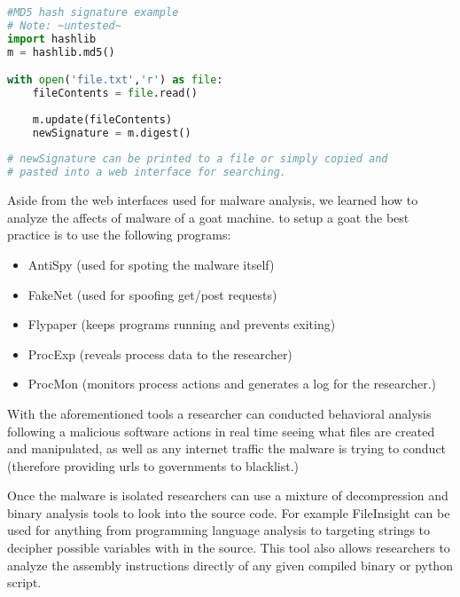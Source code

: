 \documentclass[letterpaper,12pt,titlepage,onecolumn]{IEEEtran}
\begin{document}
\begin{lstlisting}[language=Python]
#MD5 hash signature example
# Note: ~untested~
import hashlib
m = hashlib.md5()

with open('file.txt','r') as file:
    fileContents = file.read()
    
    m.update(fileContents)
    newSignature = m.digest()
    
# newSignature can be printed to a file or simply copied and 
# pasted into a web interface for searching.
\end{lstlisting}

Aside from the web interfaces used for malware analysis, we learned how to analyze the affects of malware of a goat machine. to setup a goat the best practice is to use the following programs:
\begin{itemize}
    \item AntiSpy (used for spoting the malware itself)
    \item FakeNet (used for spoofing get/post requests)
    \item Flypaper (keeps programs running and prevents exiting)
    \item ProcExp (reveals process data to the researcher)
    \item ProcMon (monitors process actions and generates a log for the researcher.)
\end{itemize}

With the aforementioned tools a researcher can conducted behavioral analysis following a malicious software actions in real time seeing what files are created and manipulated, as well as any internet traffic the malware is trying to conduct (therefore providing urls to governments to blacklist.)\par

Once the malware is isolated researchers can use a mixture of decompression and binary analysis tools to look into the source code. For example FileInsight can be used for anything from programming language analysis to targeting strings to decipher possible variables with in the source. This tool also allows researchers to analyze the assembly instructions directly of any given compiled binary or python script.



  
\nocite{*}%


\end{document}
